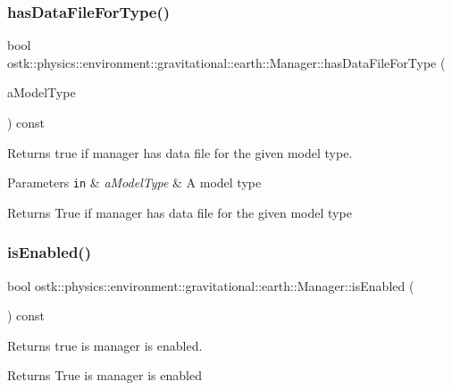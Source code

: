 \subsubsection{\texorpdfstring{has\+Data\+File\+For\+Type()}{hasDataFileForType()}}
{\footnotesize\ttfamily bool ostk\+::physics\+::environment\+::gravitational\+::earth\+::\+Manager\+::has\+Data\+File\+For\+Type (\begin{DoxyParamCaption}\item[{const \hyperlink{classostk_1_1physics_1_1environment_1_1gravitational_1_1_earth_a9895df78b5c5aab5e981bf765f8c0f05}{Earth\+Gravitational\+Model\+::\+Type} \&}]{a\+Model\+Type }\end{DoxyParamCaption}) const}



Returns true if manager has data file for the given model type. 


\begin{DoxyParams}[1]{Parameters}
\mbox{\tt in}  & {\em a\+Model\+Type} & A model type \\
\hline
\end{DoxyParams}
\begin{DoxyReturn}{Returns}
True if manager has data file for the given model type 
\end{DoxyReturn}
\mbox{\label{classostk_1_1physics_1_1environment_1_1gravitational_1_1earth_1_1_manager_a81574e302c483b652a85ae79c73afdd2}} 
\subsubsection{\texorpdfstring{is\+Enabled()}{isEnabled()}}
{\footnotesize\ttfamily bool ostk\+::physics\+::environment\+::gravitational\+::earth\+::\+Manager\+::is\+Enabled (\begin{DoxyParamCaption}{ }\end{DoxyParamCaption}) const}



Returns true is manager is enabled. 

\begin{DoxyReturn}{Returns}
True is manager is enabled 
\end{DoxyReturn}
\mbox{\label{classostk_1_1physics_1_1environment_1_1gravitational_1_1earth_1_1_manager_aa95b426416d708cf4f769697d02d7d7d}} 

